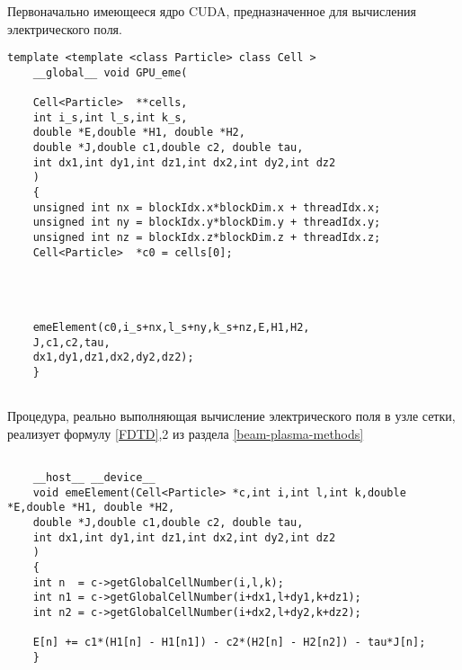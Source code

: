 \begin{ListingEnv}[!h]
	\captiondelim{ } %
\caption{Первоначально имеющееся ядро CUDA, предназначенное для вычисления электрического поля.}
\label{Original-function}	
	\begin{lstlisting}[language={[ISO]C++}]
	template <template <class Particle> class Cell >
	__global__ void GPU_eme(
	
	Cell<Particle>  **cells,
	int i_s,int l_s,int k_s,
	double *E,double *H1, double *H2,
	double *J,double c1,double c2, double tau,
	int dx1,int dy1,int dz1,int dx2,int dy2,int dz2
	)
	{
	unsigned int nx = blockIdx.x*blockDim.x + threadIdx.x;
	unsigned int ny = blockIdx.y*blockDim.y + threadIdx.y;
	unsigned int nz = blockIdx.z*blockDim.z + threadIdx.z;
	Cell<Particle>  *c0 = cells[0];
	
	
	
	
	emeElement(c0,i_s+nx,l_s+ny,k_s+nz,E,H1,H2,
	J,c1,c2,tau,
	dx1,dy1,dz1,dx2,dy2,dz2);
	}
	
	\end{lstlisting}
\end{ListingEnv}

\begin{ListingEnv}[!h]
	\captiondelim{ } %
	\caption{Процедура, реально выполняющая вычисление электрического поля в узле сетки, реализует формулу \ref{FDTD},2 из раздела \ref{beam-plasma-methods}}
	\label{listing-real-computer}	
	\begin{lstlisting}[language={[ISO]C++}]

	__host__ __device__                                                                                                    
	void emeElement(Cell<Particle> *c,int i,int l,int k,double *E,double *H1, double *H2,                          
	double *J,double c1,double c2, double tau,                                                     
	int dx1,int dy1,int dz1,int dx2,int dy2,int dz2                                                
	)                                                                                              
	{                                                                                                              
	int n  = c->getGlobalCellNumber(i,l,k);                                                                     
	int n1 = c->getGlobalCellNumber(i+dx1,l+dy1,k+dz1);                                                          
	int n2 = c->getGlobalCellNumber(i+dx2,l+dy2,k+dz2);                                                          
	
	E[n] += c1*(H1[n] - H1[n1]) - c2*(H2[n] - H2[n2]) - tau*J[n];                                                
	}   
	\end{lstlisting}
\end{ListingEnv}




